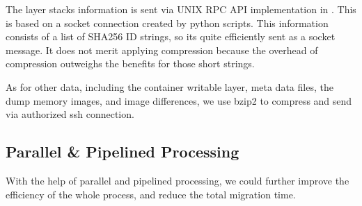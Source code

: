 The layer stacks information is sent via UNIX RPC API implementation in \cite{phaul}. This is based on a socket connection created by python scripts. This information consists of a list of SHA256 ID strings, so its quite efficiently sent as a socket message. It does not merit applying compression because the overhead of compression outweighs the benefits for those short strings.

As for other data, including the container writable layer, meta data files, the dump memory images, and image differences, we use bzip2 to compress and send via authorized ssh connection.









\subsection{Parallel \&  Pipelined Processing}\label{design:pipe}

With the help of parallel and pipelined processing,  we could further improve the efficiency of the whole process, and reduce the total migration time.

